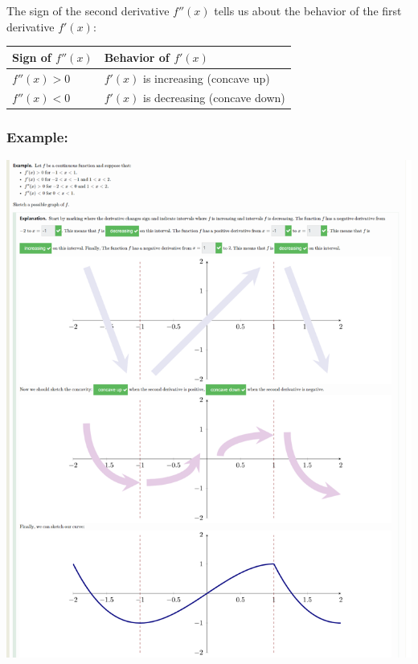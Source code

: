 \documentclass{article}
\begin{document}
The sign of the second derivative $f''(x)$ tells us about the behavior of the first derivative $f'(x)$:

\begin{center}
\begin{tabular}{@{}ll@{}}
\toprule
Sign of $f''(x)$ & Behavior of $f'(x)$ \\
\midrule
$f''(x) > 0$ & $f'(x)$ is increasing (concave up) \\
$f''(x) < 0$ & $f'(x)$ is decreasing (concave down) \\
\bottomrule
\end{tabular}
\end{center}



\newpage 

\subsubsection*{Example:}
\begin{center}
\begin{minipage}{\linewidth}
    \centering
    \includegraphics[width=1.3\textwidth]{imgs/ex.png}
\end{minipage}
\end{center}
\end{document}
